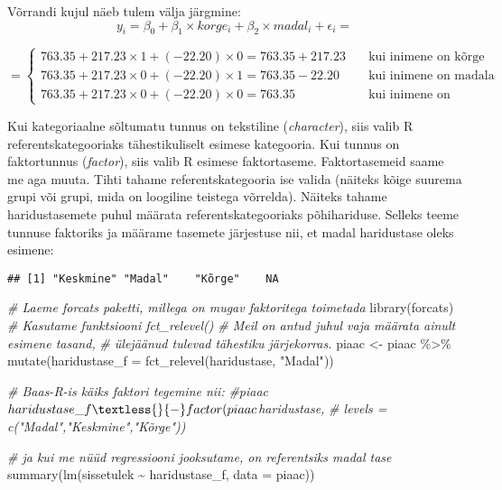 \documentclass[
]{book}
\newenvironment{Shaded}{\begin{snugshade}}{\end{snugshade}}
\newcommand{\AttributeTok}[1]{\textcolor[rgb]{0.77,0.63,0.00}{#1}}
\newcommand{\CommentTok}[1]{\textcolor[rgb]{0.56,0.35,0.01}{\textit{#1}}}
\newcommand{\FunctionTok}[1]{\textcolor[rgb]{0.00,0.00,0.00}{#1}}
\newcommand{\NormalTok}[1]{#1}
\newcommand{\OtherTok}[1]{\textcolor[rgb]{0.56,0.35,0.01}{#1}}
\newcommand{\SpecialCharTok}[1]{\textcolor[rgb]{0.00,0.00,0.00}{#1}}
\newcommand{\StringTok}[1]{\textcolor[rgb]{0.31,0.60,0.02}{#1}}
\begin{document}
Võrrandi kujul näeb tulem välja järgmine:
\[y_i=\beta_0+\beta_1 \times korge_i+\beta_2 \times madal_i+\epsilon_i =\]

\[ =
  \begin{cases}
    763.35+217.23 \times 1+(-22.20) \times 0 = 763.35+217.23  & \quad \text{kui inimene on kõrge haridustasemega}\\
    763.35+217.23 \times 0+(-22.20) \times 1 = 763.35-22.20  & \quad \text{kui inimene on madala haridustasemega}\\
    763.35+217.23 \times 0+(-22.20) \times 0 = 763.35  & \quad \text{kui inimene on keskmise haridustasemega}
  \end{cases}
\]

Kui kategoriaalne sõltumatu tunnus on tekstiline (\emph{character}), siis valib R referentskategooriaks tähestikuliselt esimese kategooria. Kui tunnus on faktortunnus (\emph{factor}), siis valib R esimese faktortaseme. Faktortasemeid saame me aga muuta. Tihti tahame referentskategooria ise valida (näiteks kõige suurema grupi või grupi, mida on loogiline teistega võrrelda). Näiteks tahame haridustasemete puhul määrata referentskategooriaks põhihariduse. Selleks teeme tunnuse faktoriks ja määrame tasemete järjestuse nii, et madal haridustase oleks esimene:

\begin{Shaded}
\end{Shaded}

\begin{verbatim}
## [1] "Keskmine" "Madal"    "Kõrge"    NA
\end{verbatim}

\begin{Shaded}
\begin{Highlighting}[]
\CommentTok{\# Laeme forcats paketti, millega on mugav faktoritega toimetada}
\FunctionTok{library}\NormalTok{(forcats)}
\CommentTok{\# Kasutame funktsiooni fct\_relevel()}
\CommentTok{\# Meil on antud juhul vaja määrata ainult esimene tasand,}
\CommentTok{\#  ülejäänud tulevad tähestiku järjekorras.}
\NormalTok{piaac }\OtherTok{\textless{}{-}}\NormalTok{ piaac }\SpecialCharTok{\%\textgreater{}\%} 
  \FunctionTok{mutate}\NormalTok{(}\AttributeTok{haridustase\_f =} \FunctionTok{fct\_relevel}\NormalTok{(haridustase, }\StringTok{"Madal"}\NormalTok{))}

\CommentTok{\# Baas{-}R{-}is käiks faktori tegemine nii:}
\CommentTok{\#piaac$haridustase\_f \textless{}{-} factor(piaac$haridustase, }
\CommentTok{\#                              levels = c("Madal","Keskmine","Kõrge"))}

\CommentTok{\# ja kui me nüüd regressiooni jooksutame, on referentsiks madal tase}
\FunctionTok{summary}\NormalTok{(}\FunctionTok{lm}\NormalTok{(sissetulek }\SpecialCharTok{\textasciitilde{}}\NormalTok{ haridustase\_f, }\AttributeTok{data =}\NormalTok{ piaac))}
\end{Highlighting}
\end{Shaded}
\end{document}
